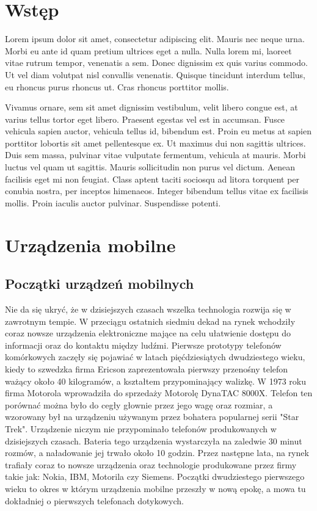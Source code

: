 \documentclass[a4paper,12pt,oneside]{book}
\begin{document}
	\newpage
	\thispagestyle{empty} %
	\tableofcontents %
	
	\newpage
	\thispagestyle{empty}
	\chapter*{Wstęp} %
	Lorem ipsum dolor sit amet, consectetur adipiscing elit. Mauris nec neque urna. Morbi eu ante id quam pretium ultrices eget a nulla. Nulla lorem mi, laoreet vitae rutrum tempor, venenatis a sem. Donec dignissim ex quis varius commodo. Ut vel diam volutpat nisl convallis venenatis. Quisque tincidunt interdum tellus, eu rhoncus purus rhoncus ut. Cras rhoncus porttitor mollis.
	
	Vivamus ornare, sem sit amet dignissim vestibulum, velit libero congue est, at varius tellus tortor eget libero. Praesent egestas vel est in accumsan. Fusce vehicula sapien auctor, vehicula tellus id, bibendum est. Proin eu metus at sapien porttitor lobortis sit amet pellentesque ex. Ut maximus dui non sagittis ultrices. Duis sem massa, pulvinar vitae vulputate fermentum, vehicula at mauris. Morbi luctus vel quam ut sagittis. Mauris sollicitudin non purus vel dictum. Aenean facilisis eget mi non feugiat. Class aptent taciti sociosqu ad litora torquent per conubia nostra, per inceptos himenaeos. Integer bibendum tellus vitae ex facilisis mollis. Proin iaculis auctor pulvinar. Suspendisse potenti.
	
	\newpage
	\thispagestyle{empty}
	\chapter{Urządzenia mobilne}
	\section{Początki urządzeń mobilnych}
	Nie da się ukryć, że w dzisiejszych czasach wszelka technologia rozwija się w zawrotnym tempie. W przeciągu ostatnich siedmiu dekad na rynek wchodziły coraz nowsze urządzenia elektroniczne mające na celu ułatwienie dostępu do informacji oraz do kontaktu między ludźmi. Pierwsze prototypy telefonów komórkowych zaczęły się pojawiać w latach pięćdziesiątych dwudziestego wieku, kiedy to szwedzka firma Ericson zaprezentowała pierwszy przenośny telefon ważący około 40 kilogramów, a kształtem przypominający walizkę. W 1973 roku firma Motorola wprowadziła do sprzedaży Motorolę DynaTAC 8000X. Telefon ten porównać można było do cegły głownie przez jego wagę oraz rozmiar, a wzorowany był na urządzeniu używanym przez bohatera popularnej serii "Star Trek". Urządzenie niczym nie przypominało telefonów produkowanych w dzisiejszych czasach. Bateria tego urządzenia wystarczyła na zaledwie 30 minut rozmów, a naładowanie jej trwało około 10 godzin. Przez następne lata, na rynek trafiały coraz to nowsze urządzenia oraz technologie produkowane przez firmy takie jak: Nokia, IBM, Motorila czy Siemens. Początki dwudziestego pierwszego wieku to okres w którym urządzenia mobilne przeszły w nową epokę, a mowa tu dokładniej o pierwszych telefonach dotykowych.
	
\end{document}
